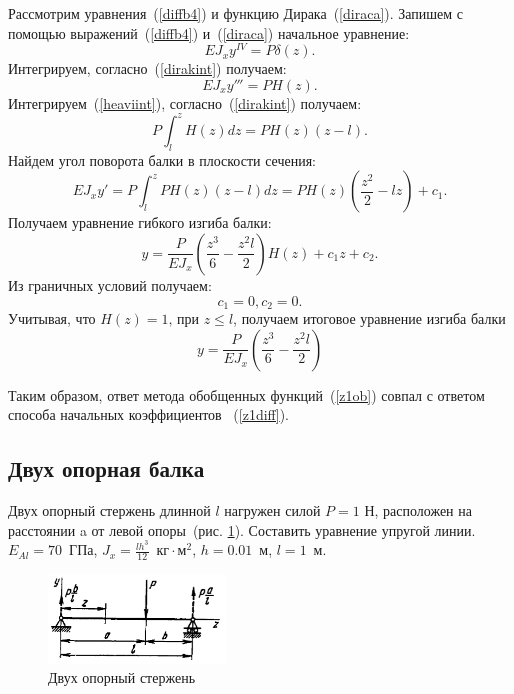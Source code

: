 \documentclass[12pt, a4paper]{article}
\begin{document}
Рассмотрим уравнения~(\ref{diffb4}) и функцию Дирака~(\ref{diraca}). Запишем с помощью выражений~(\ref{diffb4}) и~(\ref{diraca}) начальное уравнение:
\begin{equation}
	\label{z123112}
	E J_{x} y^{IV} = P \delta (z).
\end{equation} 
Интегрируем, согласно~(\ref{dirakint}) получаем: 
\begin{equation}
	\label{z12312312}
	E J_{x} y''' = P H (z).
\end{equation}
Интегрируем~(\ref{heaviint}), согласно~(\ref{dirakint}) получаем:
\begin{equation}
	\label{z312312}
	P \int_l^z  H (z) dz = P H (z) (z - l).
\end{equation}
Найдем угол поворота балки в плоскости сечения:
\begin{equation}
	\label{z31231}
	E J_{x} y' = P \int_l^z P H (z) (z - l) dz = P H(z)(\frac{z^2}{2} - l z) + c_1.
\end{equation}
Получаем уравнение гибкого изгиба балки:
\begin{equation}
	\label{z3123}
	y = \frac{P}{E J_{x}} (\frac{z^3}{6} - \frac{z^2 l}{2}) H(z) + c_1 z + c_2.
\end{equation}
Из граничных условий получаем:
\begin{equation}
	\label{z312233}
	c_1 = 0, c_2 = 0.
\end{equation}
Учитывая, что $H(z) = 1 \mbox{, при } z \leqslant l$, получаем итоговое уравнение изгиба балки
 \begin{equation}
	\label{z1ob}
	y = \frac{P}{E J_{x}} (\frac{z^3}{6} - \frac{z^2  l}{2})
\end{equation}

Таким образом, ответ метода обобщенных функций~(\ref{z1ob}) совпал с ответом способа начальных коэффициентов ~(\ref{z1diff}).
\subsection{Двух опорная балка}
Двух опорный стержень длинной $l$ нагружен силой $P = 1$ Н, расположен на расстоянии a от левой опоры~(рис. \ref{pic8}). Составить уравнение упругой линии. 
\newline 
$E_{Al} = 70$~ГПа, $J_{x} = \frac{l h^3}{12}$~$\mbox{кг} \cdot \mbox{м}^2$, $h = 0.01$~м, $l = 1$~м.

\begin{figure}[!h]
	\centering
	\includegraphics[width=0.42\textwidth]{pic.8}%
	\caption{Двух опорный стержень}
	\vspace*{-2mm}
	\label{pic8}
\end{figure}
\end{document}
